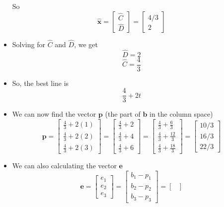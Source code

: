 \documentclass[11pt]{article}
\begin{document}
\begin{itemize}
    So
    \[
    \boldsymbol{\hat{x}} = \begin{bmatrix}
        \hat{C} \\
        \hat{D} 
    \end{bmatrix} = 
    \begin{bmatrix}
        4/3 \\
        2
    \end{bmatrix}
    \]
    \item Solving for $\hat{C}$ and $\hat{D}$, we get 
    \[\hat{D} = 2\]
    \[\hat{C} = \frac{4}{3}\]
    \item So, the best line is \[ \frac{4}{3} + 2t\]
    \item We can now find the vector $\boldsymbol{p}$ (the part of $\boldsymbol{b}$ in the
    column space)
    \[ \boldsymbol{p} =
    \begin{bmatrix}
        \frac{4}{3} + 2(1) \\
        \frac{4}{3} + 2(2) \\
        \frac{4}{3} + 2(3)
    \end{bmatrix} =
    \begin{bmatrix}
        \frac{4}{3} + 2 \\
        \frac{4}{3} + 4 \\
        \frac{4}{3} + 6
    \end{bmatrix} =
    \begin{bmatrix}
        \frac{4}{3} + \frac{6}{3} \\
        \frac{4}{3} + \frac{12}{3} \\
        \frac{4}{3} + \frac{18}{3}
    \end{bmatrix} =
    \begin{bmatrix}
        10/3 \\
        16/3 \\
        22/3 
    \end{bmatrix}
    \]
    \item We can also calculating the vector $\boldsymbol{e}$
    \[ \boldsymbol{e} =
    \begin{bmatrix}
        e_1 \\
        e_2 \\
        e_3
    \end{bmatrix} =
    \begin{bmatrix}
        b_1 - p_1 \\
        b_2 - p_2 \\
        b_3 - p_3
    \end{bmatrix} =
    \begin{bmatrix}

\end{bmatrix}\]
\end{itemize}
\end{document}
